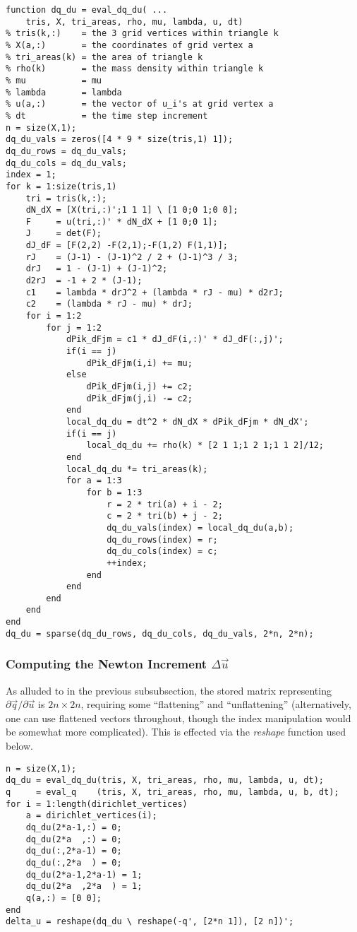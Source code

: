 \begin{verbatim}
function dq_du = eval_dq_du( ...
    tris, X, tri_areas, rho, mu, lambda, u, dt)
% tris(k,:)    = the 3 grid vertices within triangle k
% X(a,:)       = the coordinates of grid vertex a
% tri_areas(k) = the area of triangle k
% rho(k)       = the mass density within triangle k
% mu           = mu
% lambda       = lambda
% u(a,:)       = the vector of u_i's at grid vertex a
% dt           = the time step increment
n = size(X,1);
dq_du_vals = zeros([4 * 9 * size(tris,1) 1]);
dq_du_rows = dq_du_vals;
dq_du_cols = dq_du_vals;
index = 1;
for k = 1:size(tris,1)
    tri = tris(k,:);
    dN_dX = [X(tri,:)';1 1 1] \ [1 0;0 1;0 0];
    F     = u(tri,:)' * dN_dX + [1 0;0 1];
    J     = det(F);
    dJ_dF = [F(2,2) -F(2,1);-F(1,2) F(1,1)];
    rJ    = (J-1) - (J-1)^2 / 2 + (J-1)^3 / 3;
    drJ   = 1 - (J-1) + (J-1)^2;
    d2rJ  = -1 + 2 * (J-1);
    c1    = lambda * drJ^2 + (lambda * rJ - mu) * d2rJ;
    c2    = (lambda * rJ - mu) * drJ;
    for i = 1:2
        for j = 1:2
            dPik_dFjm = c1 * dJ_dF(i,:)' * dJ_dF(:,j)';
            if(i == j)
                dPik_dFjm(i,i) += mu;
            else
                dPik_dFjm(i,j) += c2;
                dPik_dFjm(j,i) -= c2;
            end
            local_dq_du = dt^2 * dN_dX * dPik_dFjm * dN_dX';
            if(i == j)
                local_dq_du += rho(k) * [2 1 1;1 2 1;1 1 2]/12;
            end
            local_dq_du *= tri_areas(k);
            for a = 1:3
                for b = 1:3
                    r = 2 * tri(a) + i - 2;
                    c = 2 * tri(b) + j - 2;
                    dq_du_vals(index) = local_dq_du(a,b);
                    dq_du_rows(index) = r;
                    dq_du_cols(index) = c;
                    ++index;
                end
            end
        end
    end
end
dq_du = sparse(dq_du_rows, dq_du_cols, dq_du_vals, 2*n, 2*n);
\end{verbatim}

\subsubsection{Computing the Newton Increment $\Delta \vec{u}$}

As alluded to in the previous subsubsection, the stored matrix representing $\partial\vec{q}/\partial\vec{u}$ is $2n \times 2n$, requiring some ``flattening'' and ``unflattening'' (alternatively, one can use flattened vectors throughout, though the index manipulation would be somewhat more complicated). This is effected via the \emph{reshape} function used below.
\begin{verbatim}
n = size(X,1);
dq_du = eval_dq_du(tris, X, tri_areas, rho, mu, lambda, u, dt);
q     = eval_q    (tris, X, tri_areas, rho, mu, lambda, u, b, dt);
for i = 1:length(dirichlet_vertices)
    a = dirichlet_vertices(i);
    dq_du(2*a-1,:) = 0;
    dq_du(2*a  ,:) = 0;
    dq_du(:,2*a-1) = 0;
    dq_du(:,2*a  ) = 0;
    dq_du(2*a-1,2*a-1) = 1;
    dq_du(2*a  ,2*a  ) = 1;
    q(a,:) = [0 0];
end
delta_u = reshape(dq_du \ reshape(-q', [2*n 1]), [2 n])';
\end{verbatim}

